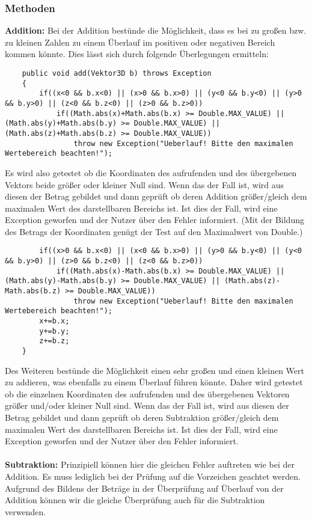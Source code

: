 \documentclass[a4paper,11pt]{scrartcl}
\begin{document}
\subsubsection{Methoden}
\textbf{Addition:}  Bei der Addition bestünde die Möglichkeit, dass es bei zu großen bzw. zu kleinen Zahlen zu einem Überlauf im positiven oder negativen Bereich kommen könnte. Dies lässt sich durch folgende Überlegungen ermitteln:
\begin{lstlisting}
	public void add(Vektor3D b) throws Exception
	{
		if((x<0 && b.x<0) || (x>0 && b.x>0) || (y<0 && b.y<0) || (y>0 && b.y>0) || (z<0 && b.z<0) || (z>0 && b.z>0))
			if((Math.abs(x)+Math.abs(b.x) >= Double.MAX_VALUE) || (Math.abs(y)+Math.abs(b.y) >= Double.MAX_VALUE) || (Math.abs(z)+Math.abs(b.z) >= Double.MAX_VALUE))
				throw new Exception("Ueberlauf! Bitte den maximalen Wertebereich beachten!");
\end{lstlisting}
Es wird also getestet ob die Koordinaten des aufrufenden und des übergebenen Vektors beide größer oder kleiner Null sind. Wenn das der Fall ist, wird aus diesen der Betrag gebildet und dann geprüft ob deren Addition größer/gleich dem maximalen Wert des darstellbaren Bereichs ist. Ist dies der Fall, wird eine Exception geworfen und der Nutzer über den Fehler informiert.
(Mit der Bildung des Betrags der Koordinaten genügt der Test auf den Maximalwert von Double.)
\begin{lstlisting}		
		if((x>0 && b.x<0) || (x<0 && b.x>0) || (y>0 && b.y<0) || (y<0 && b.y>0) || (z>0 && b.z<0) || (z<0 && b.z>0))
			if((Math.abs(x)-Math.abs(b.x) >= Double.MAX_VALUE) || (Math.abs(y)-Math.abs(b.y) >= Double.MAX_VALUE) || (Math.abs(z)-Math.abs(b.z) >= Double.MAX_VALUE))
				throw new Exception("Ueberlauf! Bitte den maximalen Wertebereich beachten!");
		x+=b.x;
		y+=b.y;
		z+=b.z;
	}
\end{lstlisting}
Des Weiteren bestünde die Möglichkeit einen sehr großen und einen kleinen Wert zu addieren, was ebenfalls zu einem Überlauf führen könnte. Daher wird getestet ob die einzelnen Koordinaten des aufrufenden und des übergebenen Vektoren größer und/oder kleiner Null sind. Wenn das der Fall ist, wird aus diesen der Betrag gebildet und dann geprüft ob deren Subtraktion größer/gleich dem maximalen Wert des darstellbaren Bereichs ist. Ist dies der Fall, wird eine Exception geworfen und der Nutzer über den Fehler informiert.\\
\\
\textbf{Subtraktion:} Prinzipiell können hier die gleichen Fehler auftreten wie bei der Addition. Es muss lediglich bei der Prüfung auf die Vorzeichen geachtet werden. Aufgrund des Bildens der Beträge in der Überprüfung auf Überlauf von der Addition können wir die gleiche Überprüfung auch für die Subtraktion verwenden.\\
\end{document}
